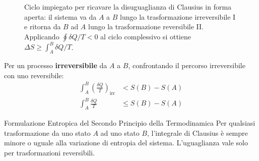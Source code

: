 \begin{figure}[ht]
    \centering
    \caption{Ciclo impiegato per ricavare la disuguaglianza di Clausius in forma aperta: il sistema va da $A$ a $B$ lungo la trasformazione irreversibile I e ritorna da $B$ ad $A$ lungo la trasformazione reversibile II. Applicando $\oint \delta Q / T < 0$ al ciclo complessivo si ottiene $\Delta S \geq \int_A^B \delta Q / T$.}
    \label{fig:disuguaglianza_clausius}
\end{figure}

Per un processo \textbf{irreversibile} da $A$ a $B$, confrontando il percorso irreversibile con uno reversibile:
\begin{align*}
    \int_{A}^{B} \left( \frac{\delta Q}{T} \right)_{\text{irr}} &< S(B) - S(A) \\
    \int_{A}^{B} \frac{\delta Q}{T} &\le S(B) - S(A)
\end{align*}

\begin{teorema}{Formulazione Entropica del Secondo Principio della Termodinamica}
Per qualsiasi trasformazione da uno stato $A$ ad uno stato $B$, l'integrale di Clausius è sempre minore o uguale alla variazione di entropia del sistema. L'uguaglianza vale solo per trasformazioni reversibili.
\end{teorema}

